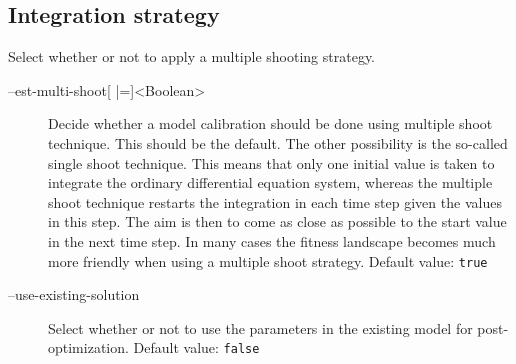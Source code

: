 \subsection{Integration strategy}

Select whether or not to apply a multiple shooting strategy.
\begin{description}
\item[--est-multi-shoot{[} |={]}<Boolean>]
          Decide whether a model calibration should be done using multiple
          shoot technique. This should be the default. The other possibility
          is the so-called single shoot technique. This means that only
          one initial value is taken to integrate the ordinary differential
          equation system, whereas the multiple shoot technique restarts
          the integration in each time step given the values in this step.
          The aim is then to come as close as possible to the start value
          in the next time step. In many cases the fitness landscape becomes
          much more friendly when using a multiple shoot strategy.
          Default value: \texttt{true}
\item[--use-existing-solution]
          Select whether or not to use the parameters in the existing model
          for post-optimization.
          Default value: \texttt{false}
\end{description}

